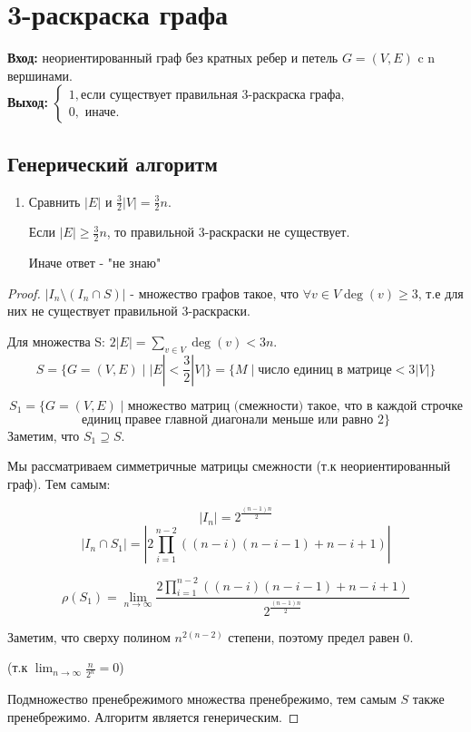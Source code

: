 \documentclass[a4paper, 12pt]{article}
\theoremstyle{definition}
\theoremstyle{remark}
\DeclareMathOperator{\degg}{deg}
\begin{document}
\section*{3-раскраска графа}
\textbf{Вход:} неориентированный граф без кратных ребер и петель $G = (V, E)$ c n вершинами.
\\
\textbf{Выход:} $\begin{cases}
    1,\text{если существует правильная 3-раскраска графа,}\\
    0,\text{ иначе.}
\end{cases}$
\subsection*{Генерический алгоритм}
\begin{enumerate}
    \item Сравнить $|E|$ и $\frac32|V|=\frac32 n$.

    Если $|E| \ge \frac32 n$, то правильной 3-раскраски не существует.
    
    Иначе ответ - "не знаю"
\end{enumerate}
\begin{proof}
    $|I_n \setminus (I_n\cap S)|$ - множество графов такое, что $\forall v\in V \degg(v) \ge 3$, т.е для них не существует правильной 3-раскраски.

    Для множества S: $2|E| = \sum_{v\in V} \degg (v) < 3n$.
    \[S = \{G = (V, E) \;|\; |E| <\frac32 |V|\} = \{M \;|\; \text{число единиц в матрице} < 3|V|\}\]

    \[S_1 = \{G = (V, E) \;|\; \text{множество матриц (смежности) такое, что в каждой строчке}\]
    \[\text{единиц правее главной диагонали меньше или равно 2}\}\]
    Заметим, что $S_1 \supseteq S$.

    Мы рассматриваем симметричные матрицы смежности (т.к неориентированный граф). Тем самым:
    
    \[|I_n| = 2^{\frac{(n-1)n}{2}}\]
    \[|I_n\cap S_1| = |2\prod_{i=1}^{n-2} ((n-i)(n-i-1) + n - i +1)|\]

    \[ \rho (S_1) = \lim_{n\to \infty} \frac{2\prod_{i=1}^{n-2}((n-i)(n-i-1) + n - i +1)}{2^{\frac{(n-1)n}{2}}}\]

    Заметим, что сверху полином $n^{2(n-2)}$ степени, поэтому предел равен 0.

    (т.к $\lim_{n\to \infty}\frac{n}{2^n} = 0$)

    Подмножество пренебрежимого множества пренебрежимо, тем самым $S$ также пренебрежимо. Алгоритм является генерическим.
\end{proof}
\end{document}
